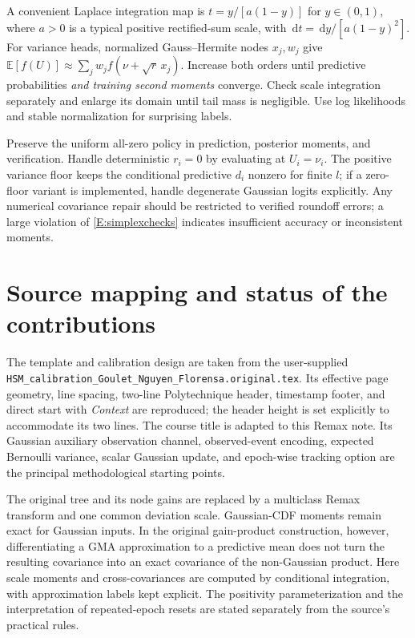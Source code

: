 \documentclass[letterpaper]{article}
\newcommand{\E}{\mathbb E}
\newcommand{\dd}{\,\mathrm d}
\begin{document}
A convenient Laplace integration map is $t=y/[a(1-y)]$ for $y\in(0,1)$, where $a>0$ is a typical positive rectified-sum scale, with $\dd t=\dd y/[a(1-y)^2]$. For variance heads, normalized Gauss--Hermite nodes $x_j,w_j$ give $\E[f(U)]\approx\sum_jw_jf(\nu+\sqrt r\,x_j)$. Increase both orders until predictive probabilities \emph{and training second moments} converge. Check scale integration separately and enlarge its domain until tail mass is negligible. Use log likelihoods and stable normalization for surprising labels.

Preserve the uniform all-zero policy in prediction, posterior moments, and verification. Handle deterministic $r_i=0$ by evaluating at $U_i=\nu_i$. The positive variance floor keeps the conditional predictive $d_i$ nonzero for finite $l$; if a zero-floor variant is implemented, handle degenerate Gaussian logits explicitly. Any numerical covariance repair should be restricted to verified roundoff errors; a large violation of \eqref{E:simplexchecks} indicates insufficient accuracy or inconsistent moments.

\section{Source mapping and status of the contributions}\label{A:sources}
The template and calibration design are taken from the user-supplied \nolinkurl{HSM_calibration_Goulet_Nguyen_Florensa.original.tex}. Its effective page geometry, line spacing, two-line Polytechnique header, timestamp footer, and direct start with \emph{Context} are reproduced; the header height is set explicitly to accommodate its two lines. The course title is adapted to this Remax note. Its Gaussian auxiliary observation channel, observed-event encoding, expected Bernoulli variance, scalar Gaussian update, and epoch-wise tracking option are the principal methodological starting points.

The original tree and its node gains are replaced by a multiclass Remax transform and one common deviation scale. Gaussian-CDF moments remain exact for Gaussian inputs. In the original gain-product construction, however, differentiating a GMA approximation to a predictive mean does not turn the resulting covariance into an exact covariance of the non-Gaussian product. Here scale moments and cross-covariances are computed by conditional integration, with approximation labels kept explicit. The positivity parameterization and the interpretation of repeated-epoch resets are stated separately from the source's practical rules.
\end{document}
